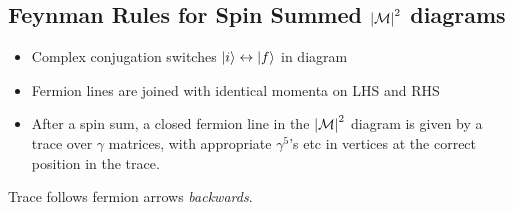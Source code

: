 \subsection{Feynman Rules for Spin Summed \texorpdfstring{$\abs{\mathcal{M}}^2$}{M squared} diagrams}%
\label{sub:feynman_rules_for_spin_summed_squared_diagrams}

\begin{itemize}
  \item Complex conjugation switches $\ket{i} \leftrightarrow \ket{f}$ in diagram
  \item Fermion lines are joined with identical momenta on LHS and RHS
  \item After a spin sum, a closed fermion line in the $\abs{\mathcal{M}}^2$ diagram is given by a trace over $\gamma$ matrices, with appropriate $\gamma^5$'s etc in vertices at the correct position in the trace.
\end{itemize}
Trace follows fermion arrows \emph{backwards}.
